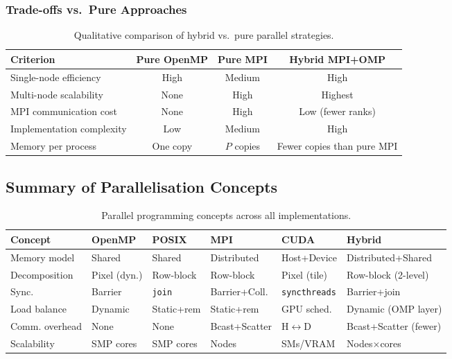 \documentclass[12pt,a4paper]{article}
\begin{document}
\subsubsection*{Trade-offs vs.\ Pure Approaches}

\begin{table}[H]
\centering
\caption{Qualitative comparison of hybrid vs.\ pure parallel strategies.}
\label{tab:hybrid-compare}
\begin{tabular}{lccc}
\toprule
\textbf{Criterion} & \textbf{Pure OpenMP} & \textbf{Pure MPI} & \textbf{Hybrid MPI+OMP} \\
\midrule
Single-node efficiency   & High     & Medium & High \\
Multi-node scalability   & None     & High   & Highest \\
MPI communication cost   & None     & High   & Low (fewer ranks) \\
Implementation complexity& Low      & Medium & High \\
Memory per process       & One copy & $P$ copies & Fewer copies than pure MPI \\
\bottomrule
\end{tabular}
\end{table}

\subsection{Summary of Parallelisation Concepts}

\begin{table}[H]
\centering
\caption{Parallel programming concepts across all implementations.}
\label{tab:concepts}
\small
\begin{tabular}{llllll}
\toprule
\textbf{Concept} & \textbf{OpenMP} & \textbf{POSIX} & \textbf{MPI} & \textbf{CUDA} & \textbf{Hybrid} \\
\midrule
Memory model  & Shared & Shared & Distributed & Host+Device & Distributed+Shared \\
Decomposition & Pixel (dyn.) & Row-block & Row-block & Pixel (tile) & Row-block (2-level) \\
Sync.         & Barrier & \texttt{join} & Barrier+Coll. & \texttt{syncthreads} & Barrier+join \\
Load balance  & Dynamic & Static+rem & Static+rem & GPU sched. & Dynamic (OMP layer) \\
Comm. overhead& None & None & Bcast+Scatter & H$\leftrightarrow$D & Bcast+Scatter (fewer) \\
Scalability   & SMP cores & SMP cores & Nodes & SMs/VRAM & Nodes$\times$cores \\
\bottomrule
\end{tabular}
\end{table}
\end{document}
